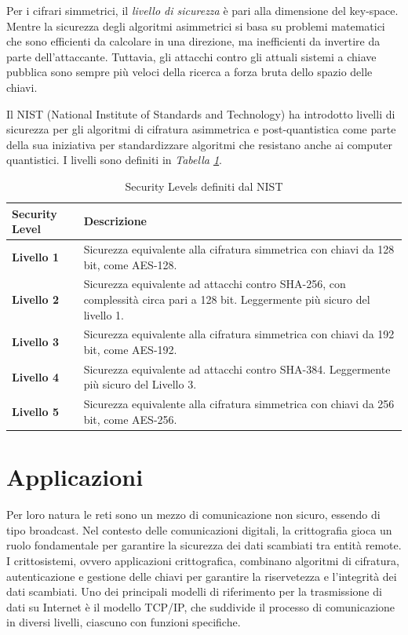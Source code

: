 Per i cifrari simmetrici, il \textit{livello di sicurezza} è pari alla dimensione del key-space. Mentre la sicurezza degli algoritmi asimmetrici si basa su problemi matematici che sono efficienti da calcolare in una direzione, ma inefficienti da invertire da parte dell'attaccante.
Tuttavia, gli attacchi contro gli attuali sistemi a chiave pubblica sono sempre più veloci della ricerca a forza bruta dello spazio delle chiavi.

Il NIST (National Institute of Standards and Technology) ha introdotto livelli di sicurezza per gli algoritmi di cifratura asimmetrica e post-quantistica come parte della sua iniziativa per standardizzare algoritmi che resistano anche ai computer quantistici.
I livelli sono definiti in \textit{Tabella \ref{tab:security-levels}}.

\renewcommand{\arraystretch}{1.3} 
\begin{table}[ht]
    \centering
    \begin{tabular}{>{\centering\arraybackslash}m{3cm}p{10cm}}
        \hline
        \textbf{Security Level} & \textbf{Descrizione} \\
        \hline
        \textbf{Livello 1} & Sicurezza equivalente alla cifratura simmetrica con chiavi da 128 bit, come AES-128.\\
        \textbf{Livello 2} & Sicurezza equivalente ad attacchi contro SHA-256, con complessità circa pari a 128 bit. Leggermente più sicuro del livello 1. \\
        \textbf{Livello 3} & Sicurezza equivalente alla cifratura simmetrica con chiavi da 192 bit, come AES-192. \\
        \textbf{Livello 4} & Sicurezza equivalente ad attacchi contro SHA-384. Leggermente più sicuro del Livello 3. \\
        \textbf{Livello 5} & Sicurezza equivalente alla cifratura simmetrica con chiavi da 256 bit, come AES-256. \\
        \hline
    \end{tabular}
    \caption{Security Levels definiti dal NIST}
    \label{tab:security-levels}
\end{table}

\newpage
\section{Applicazioni}

Per loro natura le reti sono un mezzo di comunicazione non sicuro, essendo di tipo broadcast.
Nel contesto delle comunicazioni digitali, la crittografia gioca un ruolo fondamentale per garantire la sicurezza dei dati scambiati tra entità remote. 
I crittosistemi, ovvero applicazioni crittografica, combinano algoritmi di cifratura, autenticazione e gestione delle chiavi per garantire la riservetezza e l'integrità dei dati scambiati. 
Uno dei principali modelli di riferimento per la trasmissione di dati su Internet è il modello TCP/IP, che suddivide il processo di comunicazione in diversi livelli, ciascuno con funzioni specifiche.

